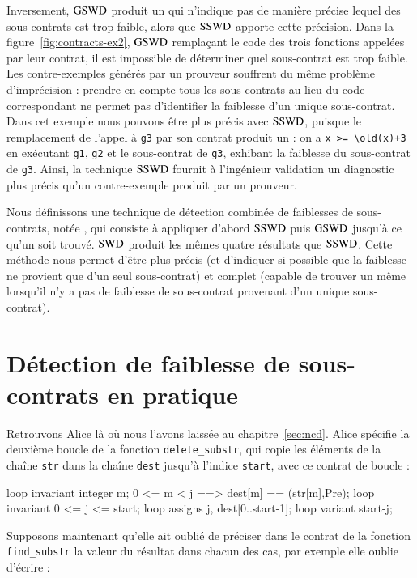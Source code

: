 Inversement, $\mathrm{GSWD}$ produit un \GSWCE qui n'indique pas de manière précise
lequel des sous-contrats est trop faible, alors que $\mathrm{SSWD}$ apporte cette
précision.
Dans la figure~\ref{fig:contracts-ex2}, $\mathrm{GSWD}$ remplaçant le code des trois
fonctions appelées par leur contrat, il est impossible de déterminer quel
sous-contrat est trop faible.
Les contre-exemples générés par un prouveur souffrent du même problème
d'imprécision : prendre en compte tous les sous-contrats au lieu du code
correspondant ne permet pas d'identifier la faiblesse d'un unique sous-contrat.
Dans cet exemple nous pouvons être plus précis avec $\mathrm{SSWD}$, puisque le
remplacement de l'appel à \lstinline'g3' par son contrat produit un \SSWCE :
on a \lstinline'x >= \old(x)+3' en exécutant
\lstinline'g1',  \lstinline'g2' et le sous-contrat de \lstinline'g3',
exhibant la faiblesse du sous-contrat de \lstinline'g3'.
Ainsi, la technique $\mathrm{SSWD}$ fournit à l'ingénieur validation un diagnostic plus
précis qu'un contre-exemple produit par un prouveur.

Nous définissons une technique de détection combinée de faiblesses de
sous-contrats, notée \SWD, qui consiste à appliquer d'abord $\mathrm{SSWD}$ puis $\mathrm{GSWD}$
jusqu'à ce qu'un \SWCE soit trouvé. 
$\mathrm{SWD}$ produit les mêmes quatre résultats que $\mathrm{SSWD}$.
Cette méthode nous permet d'être plus précis (et d'indiquer si possible que la
faiblesse ne provient que d'un seul sous-contrat) et complet (capable de trouver
un \GSWCE même lorsqu'il n'y a pas de faiblesse de sous-contrat provenant d'un
unique sous-contrat).


\section{Détection de faiblesse de sous-contrats en pratique}
\label{sec:swd-scenarios}


Retrouvons Alice là où nous l'avons laissée au chapitre~\ref{sec:ncd}.
Alice spécifie la deuxième boucle de la fonction
\lstinline'delete_substr', qui copie les éléments de la
chaîne \lstinline'str' dans la chaîne \lstinline'dest' jusqu'à l'indice
\lstinline'start', avec ce contrat de boucle :

\begin{pretty-codeACSL}
loop invariant \forall integer m; 0 <= m < j ==> dest[m] == \at(str[m],Pre);
loop invariant 0 <= j <= start;
loop assigns j, dest[0..start-1];
loop variant start-j;
\end{pretty-codeACSL}

Supposons maintenant qu'elle ait oublié de préciser dans le contrat de la
fonction \lstinline'find_substr' la valeur du résultat dans chacun des cas, par
exemple elle oublie d'écrire :


